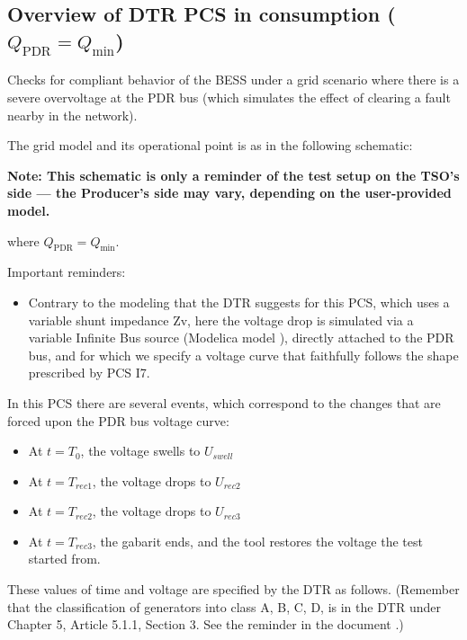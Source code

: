     \subsection{Overview of DTR PCS \DTRPcs{} in consumption ($Q_\text{PDR} = Q_\text{min}$)}

    Checks for compliant behavior of the BESS under a grid scenario where
    there is a severe overvoltage at the PDR bus (which simulates the
    effect of clearing a fault nearby in the network).

    The grid model and its operational point is as in the following schematic:
    \begin{center}
        
    \end{center}
    \begin{center}
        \small \textbf{Note: This schematic is only a reminder of the test setup on the TSO's
        side --- the Producer's side may vary, depending on the user-provided model.}
    \end{center}
    where $Q_\text{PDR} = Q_\text{min}$.

    \noindent Important reminders:
    \begin{itemize}
        \item Contrary to the modeling that the DTR suggests for this PCS, which uses a
        variable shunt impedance Zv, here the voltage drop is simulated via a variable
        Infinite Bus source (Modelica model ), directly
        attached to the PDR bus, and for which we specify a voltage curve that
        faithfully follows the shape prescribed by PCS I7.
    \end{itemize}

    In this PCS there are several events, which correspond to the changes that are
    forced upon the PDR bus voltage curve:
    \begin{itemize}
        \item At $t = T_{0}$, the voltage swells to $U_{swell}$
        \item At $t = T_{rec1}$, the voltage drops to $U_{rec2}$
        \item At $t = T_{rec2}$, the voltage drops to $U_{rec3}$
        \item At $t = T_{rec3}$, the gabarit ends, and the tool restores the
        voltage the test started from.
    \end{itemize}
    These values of time and voltage are specified by the DTR as follows. (Remember
    that the classification of generators into class A, B, C, D, is in the DTR under
    Chapter 5, Article 5.1.1, Section 3. See the reminder in the document
    .)

